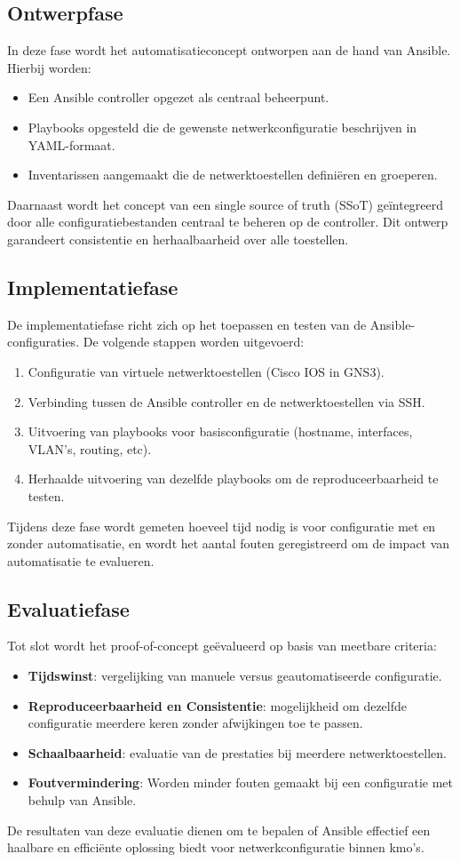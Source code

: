 \subsection{Ontwerpfase}
In deze fase wordt het automatisatieconcept ontworpen aan de hand van Ansible. Hierbij worden:
\begin{itemize}
  \item Een Ansible controller opgezet als centraal beheerpunt.
  \item Playbooks opgesteld die de gewenste netwerkconfiguratie beschrijven in YAML-formaat.
  \item Inventarissen aangemaakt die de netwerktoestellen definiëren en groeperen.
\end{itemize}
Daarnaast wordt het concept van een single source of truth (SSoT) geïntegreerd door alle configuratiebestanden centraal te beheren op de controller. Dit ontwerp garandeert consistentie en herhaalbaarheid over alle toestellen.

\subsection{Implementatiefase}
De implementatiefase richt zich op het toepassen en testen van de Ansible-configuraties. De volgende stappen worden uitgevoerd:
\begin{enumerate}
  \item Configuratie van virtuele netwerktoestellen (Cisco IOS in GNS3).
  \item Verbinding tussen de Ansible controller en de netwerktoestellen via SSH.
  \item Uitvoering van playbooks voor basisconfiguratie (hostname, interfaces, VLAN's, routing, etc).
  \item Herhaalde uitvoering van dezelfde playbooks om de reproduceerbaarheid te testen.
\end{enumerate}
Tijdens deze fase wordt gemeten hoeveel tijd nodig is voor configuratie met en zonder automatisatie, en wordt het aantal fouten geregistreerd om de impact van automatisatie te evalueren.

\subsection{Evaluatiefase}
Tot slot wordt het proof-of-concept geëvalueerd op basis van meetbare criteria:
\begin{itemize}
  \item \textbf{Tijdswinst}: vergelijking van manuele versus geautomatiseerde configuratie.
  \item \textbf{Reproduceerbaarheid en Consistentie}: mogelijkheid om dezelfde configuratie meerdere keren zonder afwijkingen toe te passen.
  \item \textbf{Schaalbaarheid}: evaluatie van de prestaties bij meerdere netwerktoestellen.
  \item \textbf{Foutvermindering}: Worden minder fouten gemaakt bij een configuratie met behulp van Ansible.

\end{itemize}
De resultaten van deze evaluatie dienen om te bepalen of Ansible effectief een haalbare en efficiënte oplossing biedt voor netwerkconfiguratie binnen kmo's.

